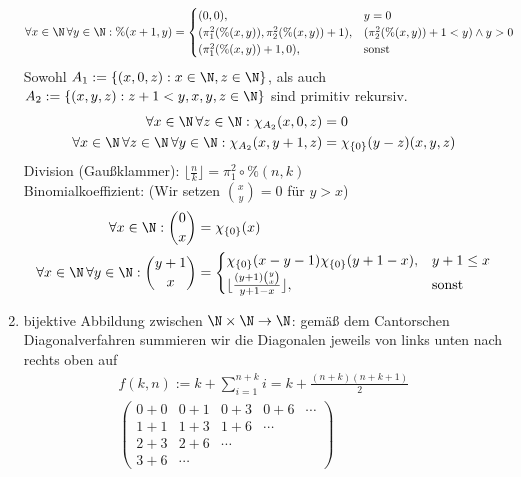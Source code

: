 \begin{solution}
\begin{enumerate}
\begin{align*}
			\forall x \in \N\, \forall y \in \N: \%(x+1,y) &= \begin{cases}
				(0,0), & y = 0 \\
				(\pi_1^2(\%(x,y)),\pi_2^2(\%(x,y)) + 1), & (\pi_2^2(\%(x,y)) + 1 < y) \land y > 0 \\
				(\pi_1^2(\%(x,y)) + 1,0), & \text{sonst} \\
			\end{cases}
		\end{align*}
		Sowohl $A_1 := \{(x,0,z): x \in \N, z \in \N\}$, als auch
		$A_2 := \{(x,y,z): z + 1 < y, x,y,z \in \N\}$ sind primitiv rekursiv.
		\begin{align*}
			\forall x \in \N\, \forall z \in \N: \chi_{A_2}(x,0,z) &= 0 \\
			\forall x \in \N\, \forall z \in \N\, \forall y \in \N: \chi_{A_2}(x,y+1,z)
			&= \chi_{\{0\}}(y-z)(x,y,z)
		\end{align*}
		Division (Gaußklammer): $\lfloor \frac{n}{k}\rfloor = \pi_1^2\circ \%(n,k)$ \\

		Binomialkoeffizient: (Wir setzen $\binom{x}{y} = 0$ für $y > x$)
		\begin{align*}
			\forall x \in \N: \binom{0}{x} &= \chi_{\{0\}}(x) \\
			\forall x \in \N\,\forall y \in \N: \binom{y+1}{x} &= \begin{cases}
				\chi_{\{0\}}(x-y-1)\chi_{\{0\}}(y+1-x), & y+1 \leq x \\
				\lfloor\frac{(y+1)\binom{y}{x}}{y+1-x}\rfloor, & \text{sonst}
			\end{cases}
		\end{align*}
		\item bijektive Abbildung zwischen $\N \times \N \to \N$: gemäß dem Cantorschen Diagonalverfahren summieren wir die Diagonalen jeweils von links unten nach rechts oben auf
			\begin{align*}
			f(k,n) := k + \sum_{i = 1}^{n + k} i = k + \frac{(n + k) (n + k + 1)}{2} \\
			\begin{pmatrix}
				0 + 0 & 0 + 1 & 0 + 3 & 0 + 6 & \cdots \\
				1 + 1 & 1 + 3 & 1 + 6 & \cdots & \\
				2 + 3 & 2 + 6 & \cdots & & \\
				3 + 6 & \cdots &&&
			\end{pmatrix}
			\end{align*}
	\end{enumerate}

\end{solution}
